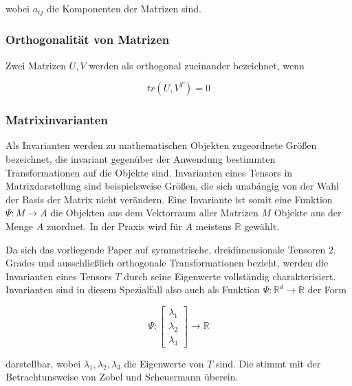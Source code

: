 \documentclass[a4paper,fontsize=12pt,toc=bib,halfparskip]{scrartcl}
\begin{document}
wobei $a_{ij}$ die Komponenten der Matrizen sind.

\subsubsection{Orthogonalit\"at von Matrizen}
Zwei Matrizen $U,V$ werden als orthogonal zueinander bezeichnet, wenn \cite{ennis2006orthogonal}

\begin{equation}
tr(U,V^{T}) = 0
\end{equation}

\subsubsection{Matrixinvarianten}
\label{Matrixinvarianten}
Als Invarianten werden zu mathematischen Objekten zugeordnete Gr\"o{\ss}en bezeichnet, die invariant gegen\"uber der Anwendung bestimmten Transformationen auf die Objekte sind. Invarianten eines Tensors in Matrixdarstellung sind beispielsweise Gr\"o{\ss}en, die sich unab\"angig von der Wahl der Basis der Matrix nicht ver\"andern\cite{ennis2006orthogonal}. Eine Invariante ist somit eine Funktion $\Psi: M \rightarrow A$ die Objekten aus dem Vektorraum aller Matrizen $M$ Objekte aus der Menge $A$ zuordnet. In der Praxis wird f\"ur $A$ meistens $\mathbb{R}$ gew\"ahlt.

Da sich das vorliegende Paper auf symmetrische, dreidimensionale Tensoren 2. Grades und ausschlie{\ss}lich orthogonale Transformationen bezieht, werden die Invarianten eines Tensors $T$ durch seine Eigenwerte vollst\"andig charakterisiert. Invarianten sind in diesem Spezialfall also auch als Funktion $\Psi: \mathbb{R}^d \rightarrow \mathbb{R}$ der Form

\begin{equation}
	\Psi:
	\begin{bmatrix}
	\lambda_1\\
	\lambda_2\\
	\lambda_3
	\end{bmatrix}
	\rightarrow \mathbb{R}
\end{equation}

darstellbar, wobei $\lambda_1, \lambda_2, \lambda_3$ die Eigenwerte von $T$ sind. Die stimmt mit der Betrachtunsweise von Zobel und Scheuermann \cite{zobel2017extremal} \"uberein.
\end{document}
